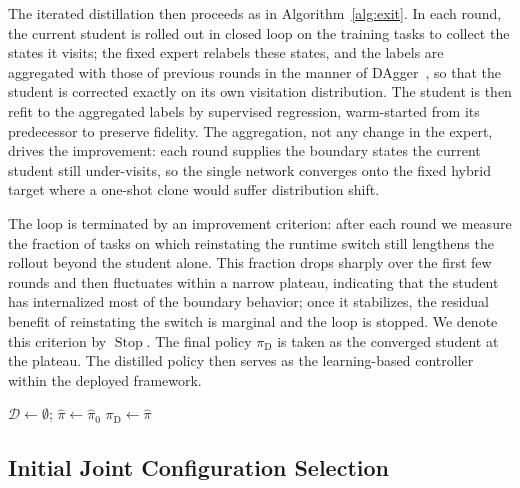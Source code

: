 \documentclass[journal, twoside]{IEEEtran}
\begin{document}
The iterated distillation then proceeds as in Algorithm~\ref{alg:exit}. In each round, the current student is rolled out in closed loop on the training tasks to collect the states it visits; the fixed expert relabels these states, and the labels are aggregated with those of previous rounds in the manner of DAgger~\cite{ross2011reduction}, so that the student is corrected exactly on its own visitation distribution. The student is then refit to the aggregated labels by supervised regression, warm-started from its predecessor to preserve fidelity. The aggregation, not any change in the expert, drives the improvement: each round supplies the boundary states the current student still under-visits, so the single network converges onto the fixed hybrid target where a one-shot clone would suffer distribution shift.

The loop is terminated by an improvement criterion: after each round we measure the fraction of tasks on which reinstating the runtime switch still lengthens the rollout beyond the student alone. This fraction drops sharply over the first few rounds and then fluctuates within a narrow plateau, indicating that the student has internalized most of the boundary behavior; once it stabilizes, the residual benefit of reinstating the switch is marginal and the loop is stopped. We denote this criterion by $\operatorname{Stop}$. The final policy $\pi_{\mathrm{D}}$ is taken as the converged student at the plateau. The distilled policy then serves as the learning-based controller within the deployed framework.

\begin{algorithm}[!htbp]
\caption{Fixed-expert iterated distillation.}
\label{alg:exit}
$\mathcal{D}\leftarrow\emptyset$; $\hat{\pi}\leftarrow\hat{\pi}_{0}$\;
\Return $\pi_{\mathrm{D}}\leftarrow\hat{\pi}$\;
\end{algorithm}

\subsection{Initial Joint Configuration Selection}\label{sec:ranking}
\end{document}
